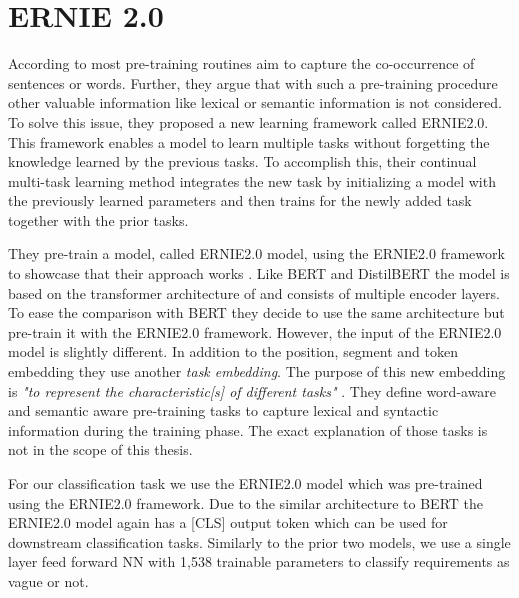 \section{ERNIE 2.0}
\label{chp:approach:sec:ernie2.0}

According to \textcite{Sun:2019a} most pre-training routines aim to capture the co-occurrence of sentences or words.
Further, they argue that with such a pre-training procedure other valuable information like lexical or semantic information is not considered.
To solve this issue, they proposed a new learning framework called \ac{ERNIE2.0}.
This framework enables a model to learn multiple tasks without forgetting the knowledge learned by the previous tasks.
To accomplish this, their continual multi-task learning method integrates the new task by initializing a model with the previously learned parameters and then trains for the newly added task together with the prior tasks.

They pre-train a model, called \ac{ERNIE2.0} model, using the \ac{ERNIE2.0} framework to showcase that their approach works .
Like \ac{BERT} and \ac{DistilBERT} the model is based on the transformer architecture of \textcite{Vaswani:2017} and consists of multiple encoder layers.
To ease the comparison with \ac{BERT} they decide to use the same architecture but pre-train it with the \ac{ERNIE2.0} framework.
However, the input of the \ac{ERNIE2.0} model is slightly different.
In addition to the position, segment and token embedding they use another \textit{task embedding}.
The purpose of this new embedding is \textit{"to represent the characteristic[s] of different tasks"} \parencite{Sun:2019a}.
They define word-aware and semantic aware pre-training tasks to capture lexical and syntactic information during the training phase.
The exact explanation of those tasks is not in the scope of this thesis. \parencite{Sun:2019a}

For our classification task we use the \ac{ERNIE2.0} model which was pre-trained using the \ac{ERNIE2.0} framework.
Due to the similar architecture to \ac{BERT} the \ac{ERNIE2.0} model again has a [CLS] output token which can be used for downstream classification tasks.
Similarly to the prior two models, we use a single layer feed forward \ac{NN} with 1,538 trainable parameters to classify requirements as vague or not.
